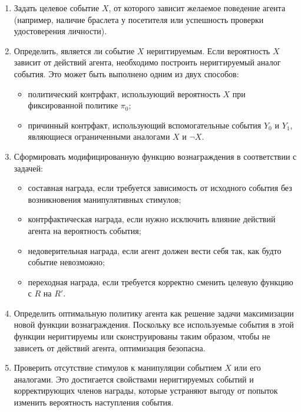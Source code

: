 \begin{enumerate}
    \item Задать целевое событие $X$, от которого зависит желаемое поведение 
    агента (например, наличие браслета у посетителя или успешность проверки 
    удостоверения личности).

    \item Определить, является ли событие $X$ нериггируемым. Если вероятность 
    $X$ зависит от действий агента, необходимо построить нериггируемый аналог 
    события. Это может быть выполнено одним из двух способов:
    \begin{itemize}
        \item политический контрфакт, использующий вероятность $X$ при 
        фиксированной политике $\pi_0$;
        \item причинный контрфакт, использующий вспомогательные события 
        $Y_0$ и $Y_1$, являющиеся ограниченными аналогами $X$ и $\lnot X$.
    \end{itemize}

    \item Сформировать модифицированную функцию вознаграждения в соответствии с задачей:
    \begin{itemize}
        \item составная награда, если требуется зависимость от исходного события
        без возникновения манипулятивных стимулов;
        \item контрфактическая награда, если нужно исключить влияние действий 
        агента на вероятность события;
        \item недоверительная награда, если агент должен вести себя так, как 
        будто событие невозможно;
        \item переходная награда, если требуется корректно сменить целевую 
        функцию с $R$ на $R'$.
    \end{itemize}

    \item Определить оптимальную политику агента как решение задачи максимизации 
    новой функции вознаграждения. Поскольку все используемые события в этой 
    функции нериггируемы или сконструированы таким образом, чтобы не зависеть 
    от действий агента, оптимизация безопасна.

    \item Проверить отсутствие стимулов к манипуляции событием $X$ или его 
    аналогами. Это достигается свойствами нериггируемых событий и корректирующих 
    членов награды, которые устраняют выгоду от попыток изменить вероятность 
    наступления события.
\end{enumerate}

